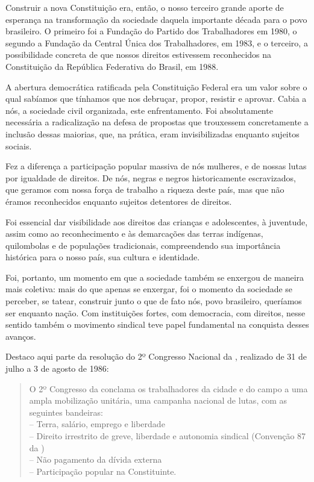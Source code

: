 Construir a nova Constituição era, então, o nosso terceiro grande aporte
de esperança na transformação da sociedade daquela importante década
para o povo brasileiro. O primeiro foi a Fundação do Partido dos
Trabalhadores em 1980, o segundo a Fundação da Central Única dos
Trabalhadores, em 1983, e o terceiro, a possibilidade concreta de que
nossos direitos estivessem reconhecidos na Constituição da República
Federativa do Brasil, em 1988.

A abertura democrática ratificada pela Constituição Federal era um valor
sobre o qual sabíamos que tínhamos que nos debruçar, propor, resistir e
aprovar. Cabia a nós, a sociedade civil organizada, este enfrentamento. Foi
absolutamente necessária a radicalização na defesa de propostas que
trouxessem concretamente a inclusão dessas maiorias, que, na prática,
eram invisibilizadas enquanto sujeitos sociais.

Fez a diferença a participação popular massiva de nós mulheres, e de nossas
lutas por igualdade de direitos. De nós, negras e negros
historicamente escravizados, que geramos com nossa força de trabalho a
riqueza deste país, mas que não éramos reconhecidos enquanto sujeitos
detentores de direitos.

Foi essencial dar visibilidade aos direitos das crianças e adolescentes,
à juventude, assim como ao reconhecimento e às demarcações das terras
indígenas, quilombolas e de populações tradicionais, compreendendo sua
importância histórica para o nosso país, sua cultura e identidade.

Foi, portanto, um momento em que a sociedade também se enxergou de
maneira mais coletiva: mais do que apenas se enxergar,
foi o momento da sociedade se perceber, se tatear, construir junto o que
de fato nós, povo brasileiro, queríamos ser enquanto nação. Com
instituições fortes, com democracia, com direitos, nesse sentido também o
movimento sindical teve papel fundamental na conquista desses avanços.

Destaco aqui parte da resolução do 2º Congresso Nacional da ,
realizado de 31 de julho a 3 de agosto de 1986:

\begin{quote}
O 2º Congresso da  conclama os trabalhadores da cidade e do
campo a uma ampla mobilização unitária, uma campanha nacional de lutas,
com as seguintes bandeiras:\\
-- Terra, salário, emprego e liberdade\\
-- Direito irrestrito de greve, liberdade e autonomia sindical (Convenção
87 da )\\
-- Não pagamento da dívida externa\\
-- Participação popular na Constituinte.
\end{quote}

